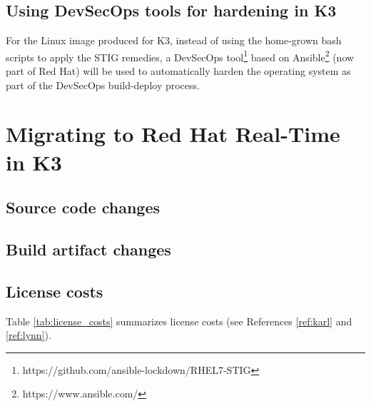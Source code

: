\documentclass[12pt]{article}
\begin{document}
\subsection{Using DevSecOps tools for hardening in K3}
For the Linux image produced for K3, instead of using the home-grown bash
scripts to apply the STIG remedies, a DevSecOps
tool\footnote{https://github.com/ansible-lockdown/RHEL7-STIG} based on
Ansible\footnote{https://www.ansible.com/} (now part of Red Hat) will be used to
automatically harden the operating system as part of the DevSecOps build-deploy
process.

%
\newpage
\section{Migrating to Red Hat Real-Time in K3}
\label{sec:redhat_migration}

\subsection{Source code changes}

\subsection{Build artifact changes}

\subsection{License costs}

Table \ref{tab:license_costs} summarizes license costs (see References
\ref{ref:karl} and \ref{ref:lynn}).

\begin{table}[H]
\captionsetup{width=.9\linewidth}
\caption{License costs}
\label{tab:license_costs}
\end{table}
\end{document}
